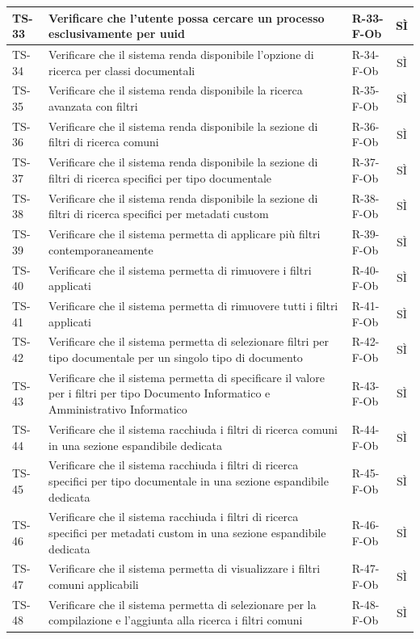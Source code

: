 \documentclass[a4paper,12pt]{article}
\begin{document}
\begin{longtable}{|p{1.5cm}|p{8.3cm}|p{2.4cm}|c|}
\hline
TS-33 & Verificare che l'utente possa cercare un processo esclusivamente per uuid & R-33-F-Ob & SÌ \\
\hline
TS-34 & Verificare che il sistema renda disponibile l'opzione di ricerca per classi documentali & R-34-F-Ob & SÌ \\
\hline
TS-35 & Verificare che il sistema renda disponibile la ricerca avanzata con filtri & R-35-F-Ob & SÌ \\
\hline
TS-36 & Verificare che il sistema renda disponibile la sezione di filtri di ricerca comuni & R-36-F-Ob & SÌ \\
\hline
TS-37 & Verificare che il sistema renda disponibile la sezione di filtri di ricerca specifici per tipo documentale & R-37-F-Ob & SÌ \\
\hline
TS-38 & Verificare che il sistema renda disponibile la sezione di filtri di ricerca specifici per metadati custom & R-38-F-Ob & SÌ \\
\hline
TS-39 & Verificare che il sistema permetta di applicare più filtri contemporaneamente & R-39-F-Ob & SÌ \\
\hline
TS-40 & Verificare che il sistema permetta di rimuovere i filtri applicati & R-40-F-Ob & SÌ \\
\hline
TS-41 & Verificare che il sistema permetta di rimuovere tutti i filtri applicati & R-41-F-Ob & SÌ \\
\hline
TS-42 & Verificare che il sistema permetta di selezionare filtri per tipo documentale per un singolo tipo di documento & R-42-F-Ob & SÌ \\
\hline
TS-43 & Verificare che il sistema permetta di specificare il valore per i filtri per tipo Documento Informatico e Amministrativo Informatico & R-43-F-Ob & SÌ \\
\hline
TS-44 & Verificare che il sistema racchiuda i filtri di ricerca comuni in una sezione espandibile dedicata & R-44-F-Ob & SÌ \\
\hline
TS-45 & Verificare che il sistema racchiuda i filtri di ricerca specifici per tipo documentale in una sezione espandibile dedicata & R-45-F-Ob & SÌ \\
\hline
TS-46 & Verificare che il sistema racchiuda i filtri di ricerca specifici per metadati custom in una sezione espandibile dedicata & R-46-F-Ob & SÌ \\
\hline
TS-47 & Verificare che il sistema permetta di visualizzare i filtri comuni applicabili & R-47-F-Ob & SÌ \\
\hline
TS-48 & Verificare che il sistema permetta di selezionare per la compilazione e l'aggiunta alla ricerca i filtri comuni & R-48-F-Ob & SÌ \\

\end{longtable}
\end{document}
